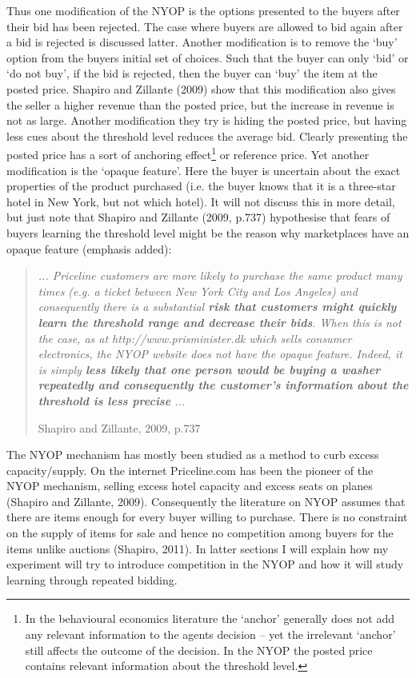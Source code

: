 \documentclass[a4paper,12pt]{article}
\begin{document}
	Thus one modification of the NYOP is the options presented to the buyers after their bid has been rejected. The case where buyers are allowed to bid again after a bid is rejected is discussed latter. Another modification is to remove the `buy' option from the buyers initial set of choices. Such that the buyer can only `bid' or `do not buy', if the bid is rejected, then the buyer can `buy' the item at the posted price. Shapiro and Zillante (2009) show that this modification also gives the seller a higher revenue than the posted price, but the increase in revenue is not as large. Another modification they try is hiding the posted price, but having less cues about the threshold level reduces the average bid. Clearly presenting the posted price has a sort of anchoring effect\footnote{In the behavioural economics literature the `anchor' generally does not add any relevant information to the agents decision -- yet the irrelevant `anchor' still affects the outcome of the decision. In the NYOP the posted price contains relevant information about the threshold level.} or reference price. Yet another modification is the `opaque feature'. Here the buyer is uncertain about the exact properties of the product purchased (i.e. the buyer knows that it is a three-star hotel in New York, but not which hotel). It will not discuss this in more detail, but just note that Shapiro and Zillante (2009, p.737) hypothesise that fears of buyers learning the threshold level might be the reason why marketplaces have an opaque feature (emphasis added):
	\blockquote[Shapiro and Zillante, 2009, p.737]{\emph{ ... Priceline customers are more likely to purchase the same product many times (e.g. a ticket between New York City and Los Angeles) and consequently there is a substantial {\bf risk that customers might quickly learn the threshold range and decrease their bids}. When this is not the case, as at http://www.prisminister.dk which sells consumer electronics, the NYOP website does not have the opaque feature. Indeed, it is simply {\bf less likely that one person would be buying a washer repeatedly and consequently the customer's information about the threshold is less precise} ...}}

	The NYOP mechanism has mostly been studied as a method to curb excess capacity/supply. On the internet Priceline.com has been the pioneer of the NYOP mechanism, selling excess hotel capacity and excess seats on planes (Shapiro and Zillante, 2009). Consequently the literature on NYOP assumes that there are items enough for every buyer willing to purchase. There is no constraint on the supply of items for sale and hence no competition among buyers for the items unlike auctions (Shapiro, 2011). In latter sections I will explain how my experiment will try to introduce competition in the NYOP and how it will study learning through repeated bidding.
\end{document}
